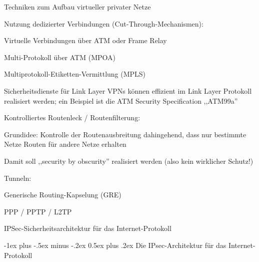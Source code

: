 \documentclass[a4paper]{article}
\makeatletter
\renewcommand{\section}{\@startsection{section}{1}{0mm}%
 {-1ex plus -.5ex minus -.2ex}%
 {0.5ex plus .2ex}%
 {\normalfont\large\bfseries}}
\makeatother
\begin{document}
\begin{multicols}{3}
      Techniken zum Aufbau virtueller privater Netze
      \begin{itemize*}
            \item Nutzung dedizierter Verbindungen (Cut-Through-Mechanismen):
            \begin{itemize*}
                  \item Virtuelle Verbindungen über ATM oder Frame Relay
                  \item Multi-Protokoll über ATM (MPOA)
                  \item Multiprotokoll-Etiketten-Vermittlung (MPLS)
                  \item Sicherheitsdienste für Link Layer VPNs können effizient im Link Layer Protokoll realisiert werden; ein Beispiel ist die ATM Security Specification ,,ATM99a''
            \end{itemize*}
            \item Kontrolliertes Routenleck / Routenfilterung:
            \begin{itemize*}
                  \item Grundidee: Kontrolle der Routenausbreitung dahingehend, dass nur bestimmte Netze Routen für andere Netze erhalten
                  \item Damit soll ,,security by obscurity'' realisiert werden (also kein wirklicher Schutz!)
            \end{itemize*}
            \item Tunneln:
            \begin{itemize*}
                  \item Generische Routing-Kapselung (GRE)
                  \item PPP / PPTP / L2TP
                  \item IPSec-Sicherheitsarchitektur für das Internet-Protokoll
            \end{itemize*}
      \end{itemize*}

      \section{Die IPsec-Architektur für das Internet-Protokoll}

\end{multicols}
\end{document}
